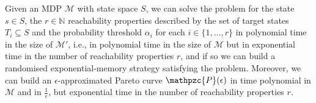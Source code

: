 \begin{theorem} \label{theorem-mosr-final}
  Given an MDP $\mathcal{M}$ with state space $S$, we can solve the \MOSR{} problem for the state $s \in S$, the $r \in \mathbb{N}$ reachability properties described by the set of target states $T_i \subseteq S$ and the probability threshold $\alpha_i$ for each $i \in \{1, \dots, r\}$ in polynomial time in the size of $\mathcal{M}'$, i.e., in
  polynomial time in the size of $\mathcal{M}$ but in exponential time in the number of reachability properties $r$, and if so we can build a randomised exponential-memory strategy satisfying the problem.
  Moreover, we can build an $\epsilon$-approximated Pareto curve $\mathpzc{P}(\epsilon)$ in time polynomial in $\mathcal{M}$ and in $\frac{1}{\epsilon}$, but exponential time in the number of reachability properties $r$.
\end{theorem}

